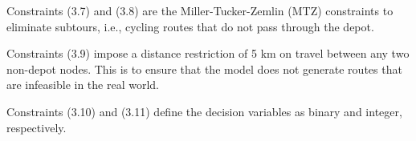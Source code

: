 \documentclass[12pt]{article}
\begin{document}
Constraints (3.7) and (3.8) are the Miller-Tucker-Zemlin (MTZ) constraints to eliminate subtours,
i.e., cycling routes that do not pass through the depot.

Constraints (3.9) impose a distance restriction of 5 km on travel between any two non-depot nodes.
This is to ensure that the model does not generate routes that are infeasible in the real world.

Constraints (3.10) and (3.11) define the decision variables as binary and integer, respectively.
\end{document}
